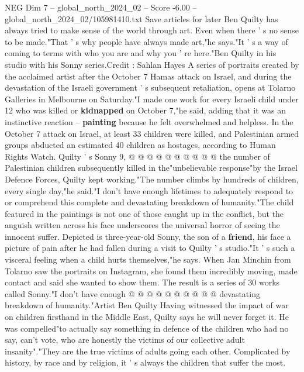 \begin{textsample}{NEG Dim 7 – global\_north\_2024\_02 – Score -6.00 – global\_north\_2024\_02/105981410.txt}  \label{ex:f7_neg_287}
Save articles for later Ben Quilty has always tried to make sense of the world through art.
Even when there ' s no sense to be made."That ' s why people have always made art,"he says."It ' s a way of coming to terms with who you are and why you ' re here."Ben Quilty in his studio with his Sonny series.Credit : Sahlan Hayes A series of portraits created by the acclaimed artist after the October 7 Hamas attack on Israel, and during the devastation of the Israeli government ' s subsequent retaliation, opens at Tolarno Galleries in Melbourne on Saturday."I made one work for every Israeli child under 12 who was killed or \textbf{kidnapped} on October 7,"he said, adding that it was an instinctive reaction -- \textbf{painting} because he felt overwhelmed and helpless.
In the October 7 attack on Israel, at least 33 children were killed, and Palestinian armed groups abducted an estimated 40 children as hostages, according to Human Rights Watch.
Quilty ' s Sonny 9, @ @ @ @ @ @ @ @ @ @ the number of Palestinian children subsequently killed in the"unbelievable response"by the Israel Defence Forces, Quilty kept working."The number climbs by hundreds of children, every single day,"he said."I don't have enough lifetimes to adequately respond to or comprehend this complete and devastating breakdown of humanity."The child featured in the paintings is not one of those caught up in the conflict, but the anguish written across his face underscores the universal horror of seeing the innocent suffer.
Depicted is three-year-old Sonny, the son of a \textbf{friend}, his face a picture of pain after he had fallen during a visit to Quilty ' s studio."It ' s such a visceral feeling when a child hurts themselves,"he says.
When Jan Minchin from Tolarno saw the portraits on Instagram, she found them incredibly moving, made contact and said she wanted to show them.
The result is a series of 30 works called Sonny."I don't have enough @ @ @ @ @ @ @ @ @ @ devastating breakdown of humanity."Artist Ben Quilty Having witnessed the impact of war on children firsthand in the Middle East, Quilty says he will never forget it.
He was compelled"to actually say something in defence of the children who had no say, can't vote, who are honestly the victims of our collective adult insanity"."They are the true victims of adults going each other.
Complicated by history, by race and by religion, it ' s always the children that suffer the most.

\end{textsample}
